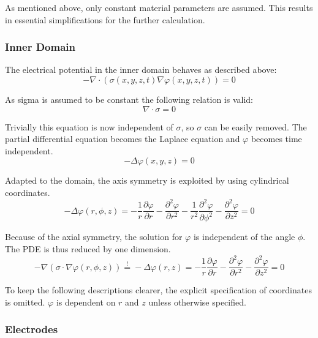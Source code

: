 \documentclass[parskip=half, titlepage=yes, 12pt, BCOR=12mm, DIV=calc]{scrartcl}
\begin{document}
As mentioned above, only constant material parameters are assumed. This results in essential simplifications for the further calculation.

\subsubsection{Inner Domain}

The electrical potential in the inner domain behaves as described above:
\begin{equation}
    - \nabla \cdot (\sigma(x,y,z,t) \nabla \varphi(x,y,z,t)) = 0
\end{equation}

As sigma is assumed to be constant the following relation is valid:
\begin{equation}
    \nabla \cdot \sigma = 0
\end{equation}

Trivially this equation is now independent of $\sigma$, so $\sigma$ can be easily removed. The partial differential equation becomes the Laplace equation and $\varphi$ becomes time independent.
\begin{equation}
    - \Delta \varphi(x,y,z) = 0
\end{equation}

Adapted to the domain, the axis symmetry is exploited by using cylindrical coordinates.
\begin{equation}
    - \Delta \varphi(r,\phi,z) = - \frac{1}{r} \frac{\partial \varphi}{\partial r} - \frac{\partial^2 \varphi}{\partial r^2} - \frac{1}{r^2} \frac{\partial^2 \varphi}{\partial \phi^2} -      \frac{\partial^2 \varphi}{\partial z^2}  = 0
\end{equation}

Because of the axial symmetry, the solution for $\varphi$ is independent of the angle $\phi$. The PDE is thus reduced by one dimension. 
\begin{equation}
    - \nabla  ( \sigma \cdot \nabla \varphi(r,\phi,z)) \overset{!}{=} - \Delta \varphi(r,z) = - \frac{1}{r} \frac{\partial \varphi}{\partial r} - \frac{\partial^2 \varphi}{\partial r^2} - \frac{\partial^2 \varphi}{\partial z^2} = 0
\end{equation}

To keep the following descriptions clearer, the explicit specification of coordinates is omitted. $\varphi$ is dependent on $r$ and $z$ unless otherwise specified.

\subsubsection{Electrodes}
\end{document}
